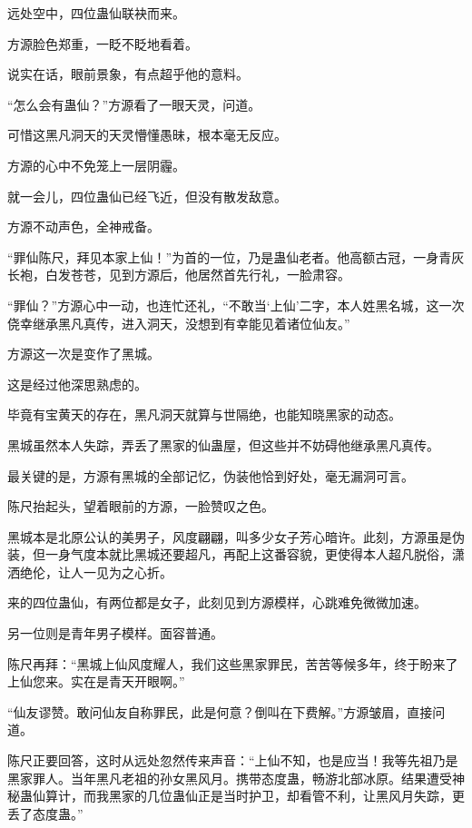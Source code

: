 
\begin{this_body}



远处空中，四位蛊仙联袂而来。

方源脸色郑重，一眨不眨地看着。

说实在话，眼前景象，有点超乎他的意料。

“怎么会有蛊仙？”方源看了一眼天灵，问道。

可惜这黑凡洞天的天灵懵懂愚昧，根本毫无反应。

方源的心中不免笼上一层阴霾。

就一会儿，四位蛊仙已经飞近，但没有散发敌意。

方源不动声色，全神戒备。

“罪仙陈尺，拜见本家上仙！”为首的一位，乃是蛊仙老者。他高额古冠，一身青灰长袍，白发苍苍，见到方源后，他居然首先行礼，一脸肃容。

“罪仙？”方源心中一动，也连忙还礼，“不敢当‘上仙’二字，本人姓黑名城，这一次侥幸继承黑凡真传，进入洞天，没想到有幸能见着诸位仙友。”

方源这一次是变作了黑城。

这是经过他深思熟虑的。

毕竟有宝黄天的存在，黑凡洞天就算与世隔绝，也能知晓黑家的动态。

黑城虽然本人失踪，弄丢了黑家的仙蛊屋，但这些并不妨碍他继承黑凡真传。

最关键的是，方源有黑城的全部记忆，伪装他恰到好处，毫无漏洞可言。

陈尺抬起头，望着眼前的方源，一脸赞叹之色。

黑城本是北原公认的美男子，风度翩翩，叫多少女子芳心暗许。此刻，方源虽是伪装，但一身气度本就比黑城还要超凡，再配上这番容貌，更使得本人超凡脱俗，潇洒绝伦，让人一见为之心折。

来的四位蛊仙，有两位都是女子，此刻见到方源模样，心跳难免微微加速。

另一位则是青年男子模样。面容普通。

陈尺再拜：“黑城上仙风度耀人，我们这些黑家罪民，苦苦等候多年，终于盼来了上仙您来。实在是青天开眼啊。”

“仙友谬赞。敢问仙友自称罪民，此是何意？倒叫在下费解。”方源皱眉，直接问道。

陈尺正要回答，这时从远处忽然传来声音：“上仙不知，也是应当！我等先祖乃是黑家罪人。当年黑凡老祖的孙女黑风月。携带态度蛊，畅游北部冰原。结果遭受神秘蛊仙算计，而我黑家的几位蛊仙正是当时护卫，却看管不利，让黑风月失踪，更丢了态度蛊。”


\end{this_body}
